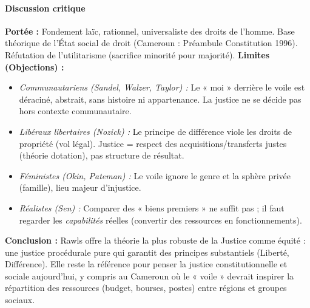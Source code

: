 \documentclass[11pt]{article}
\newcommand{\cle}[1]{{\popxbold\color{popdark}#1}}
\begin{document}
\begin{exoresolu}
    \paragraph{Discussion critique}
    \textbf{Portée :} Fondement laïc, rationnel, universaliste des droits de l'homme. Base théorique de l'État social de droit (Cameroun : Préambule Constitution 1996). Réfutation de l'utilitarisme (sacrifice minorité pour majorité).
    \textbf{Limites (Objections) :}
    \begin{itemize}
        \item \emph{Communautariens (Sandel, Walzer, Taylor) :} Le « moi » derrière le voile est déraciné, abstrait, sans histoire ni appartenance. La justice ne se décide pas hors contexte communautaire.
        \item \emph{Libéraux libertaires (Nozick) :} Le principe de différence viole les droits de propriété (vol légal). Justice = respect des acquisitions/transferts justes (théorie dotation), pas structure de résultat.
        \item \emph{Féministes (Okin, Pateman) :} Le voile ignore le genre et la sphère privée (famille), lieu majeur d'injustice.
        \item \emph{Réalistes (Sen) :} Comparer des « biens premiers » ne suffit pas ; il faut regarder les \emph{capabilités} réelles (convertir des ressources en fonctionnements).
    \end{itemize}
    \textbf{Conclusion :} Rawls offre la théorie la plus robuste de la \cle{Justice comme équité} : une justice procédurale pure qui garantit des principes substantiels (Liberté, Différence). Elle reste la référence pour penser la justice constitutionnelle et sociale aujourd'hui, y compris au Cameroun où le « voile » devrait inspirer la répartition des ressources (budget, bourses, postes) entre régions et groupes sociaux.
\end{exoresolu}
\end{document}
